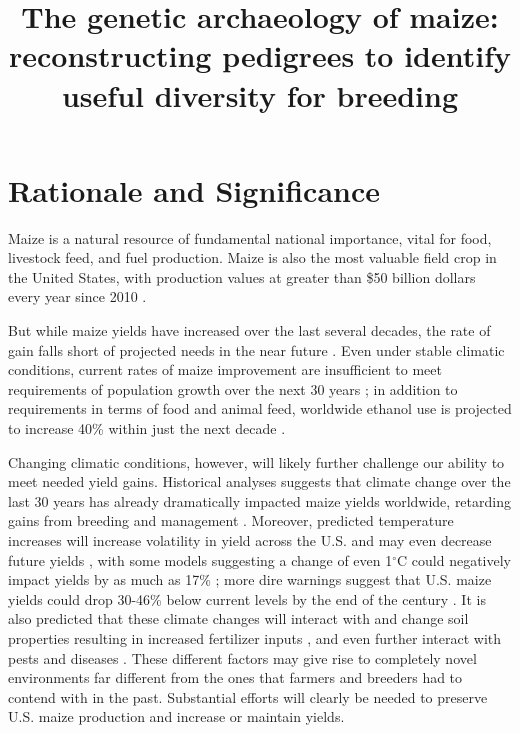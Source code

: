\documentclass[12pt]{article}
\begin{document}
\title{\vspace{-5ex}The genetic archaeology of maize: reconstructing pedigrees to identify useful diversity for breeding\vspace{-4ex}}
\author{}
\date{}
\maketitle

\section*{Rationale and Significance}
\label{sec:rationale}

Maize is a natural resource of fundamental national importance, vital for food, livestock feed, and fuel production.
Maize is also the most valuable field crop in the United States, with production values at greater than \$50 billion dollars every year since 2010 \citep{Tho98w}. 

But while maize yields have increased over the last several decades, the rate of gain falls short of projected needs in the near future \citep{grassini2013distinguishing}.
Even under stable climatic conditions, current rates of maize improvement are insufficient to meet requirements of population growth over the next 30 years \citep{ray2013yield}; in  addition to requirements in terms of food and animal feed, worldwide ethanol use is projected to increase 40\% within just the next decade \citep{wtf2015usda}.

Changing climatic conditions, however, will likely further challenge our ability to meet needed yield gains. 
Historical analyses suggests that climate change over the last 30 years has already dramatically impacted maize yields worldwide, retarding gains from breeding and management \citep{Lobell2011}.
Moreover, predicted temperature increases will increase volatility in yield across the U.S. and may even decrease future yields \citep{urban2012projected}, with some models suggesting a change of even 1$^{\circ}$C could negatively impact yields by as much as 17\% \citep{lobell2003climate}; more dire warnings suggest that U.S. maize yields could drop 30-46\% below current levels by the end of the century \citep{schlenker2009nonlinear}.
It is also predicted that these climate changes will interact with and change soil properties resulting in increased fertilizer inputs \citep{rosenzweig2014assessing}, and even further interact with pests and diseases \citep{anderson2004emerging}. 
These different factors may give rise to completely novel environments far different from the ones that farmers and breeders had to contend with in the past. 
Substantial efforts will clearly be needed to preserve U.S. maize production and increase or maintain yields.  
\end{document}
